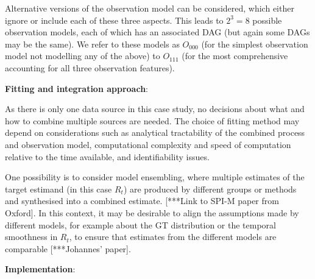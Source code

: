 \documentclass{article}
\begin{document}
Alternative versions of the observation model can be considered, which either ignore or include each of these three aspects. This leads to $2^3=8$ possible observation models, each of which has an associated DAG (but again some DAGs may be the same).
We refer to these models as $O_{000}$ (for the simplest observation model not modelling any of the above) to $O_{111}$ (for the most comprehensive accounting for all three observation features).

\textbf{Fitting and integration approach}:

As there is only one data source in this case study, no decisions about what and how to combine multiple sources are needed. The choice of fitting method may depend on considerations such as analytical tractability of the combined process and observation model, computational complexity and speed of computation relative to the time available, and identifiability issues. 
 

One possibility is to consider model ensembling, where multiple estimates of the target estimand (in this case $R_t$) are produced by different groups or methods and synthesised into a combined estimate. [***Link to SPI-M paper from Oxford]. In this context, it may be desirable to align the assumptions made by different models, for example about the GT distribution or the temporal smoothness in $R_t$, to ensure that estimates from the different models are  comparable [***Johannes’ paper].

\textbf{Implementation}:
\end{document}
